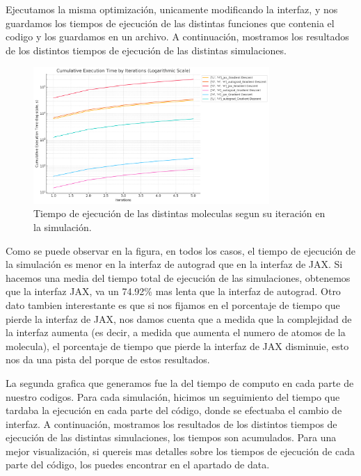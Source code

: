 Ejecutamos la misma optimización, unicamente modificando la interfaz, y nos guardamos los tiempos de ejecución de las distintas funciones que contenia el codigo y los guardamos en un archivo. A continuación, mostramos los resultados de los distintos tiempos de ejecución de las distintas simulaciones.

\begin{figure}[H]
  \centering
  \includegraphics[width=0.8\textwidth]{img/time_iterations.png}
  \caption{Tiempo de ejecución de las distintas moleculas segun su iteración en la simulación.}
  \label{fig:time_iterations}
\end{figure}

Como se puede observar en la figura, en todos los casos, el tiempo de ejecución de la simulación es menor en la interfaz de autograd que en la interfaz de JAX. Si hacemos una media del tiempo total de ejecución de las simulaciones, obtenemos que la interfaz JAX, va un 74.92\% mas lenta que la interfaz de autograd. Otro dato tambien interestante es que si nos fijamos en el porcentaje de tiempo que pierde la interfaz de JAX, nos damos cuenta que a medida que la complejidad de la interfaz aumenta (es decir, a medida que aumenta el numero de atomos de la molecula), el porcentaje de tiempo que pierde la interfaz de JAX disminuie, esto nos da una pista del porque de estos resultados.

La segunda grafica que generamos fue la del tiempo de computo en cada parte de nuestro codigos. Para cada simulación, hicimos un seguimiento del tiempo que tardaba la ejecución en cada parte del código, donde se efectuaba el cambio de interfaz. A continuación, mostramos los resultados de los distintos tiempos de ejecución de las distintas simulaciones, los tiempos son acumulados. Para una mejor visualización, si quereis mas detalles sobre los tiempos de ejecución de cada parte del código, los puedes encontrar en el apartado de data.

